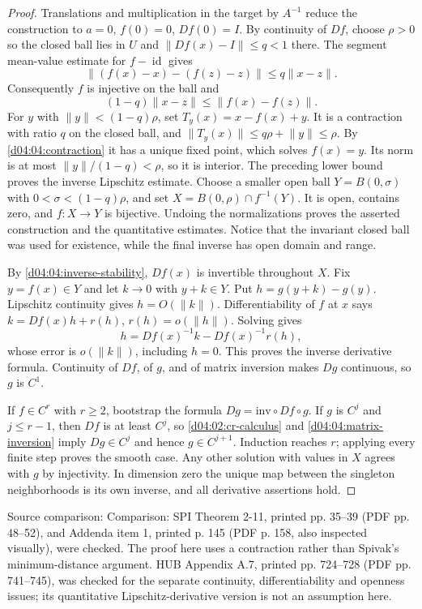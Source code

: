 \documentclass[11pt,oneside,openany]{book}
\theoremstyle{definition}
\theoremstyle{remark}
\newcommand{\norm}[1]{\lVert#1\rVert}
\DeclareMathOperator{\id}{id}
\newcommand{\source}[1]{\par\begingroup\small\sffamily\color{black!65}Source comparison: #1\par\endgroup}
\begin{document}
\begin{proof}
Translations and multiplication in the target by $A^{-1}$ reduce the
construction to $a=0$, $f(0)=0$, $Df(0)=I$. By continuity of $Df$,
choose $\rho>0$ so the closed ball lies in $U$ and
$\norm{Df(x)-I}\leq q<1$ there. The segment mean-value estimate for
$f-\id$ gives
\[
 \norm{(f(x)-x)-(f(z)-z)}\leq q\norm{x-z}.
\]
Consequently $f$ is injective on the ball and
\[
 (1-q)\norm{x-z}\leq\norm{f(x)-f(z)}.
\]
For $y$ with $\norm{y}<(1-q)\rho$, set $T_y(x)=x-f(x)+y$.
It is a contraction with ratio $q$ on the closed ball, and
$\norm{T_y(x)}\leq q\rho+\norm{y}\leq\rho$.
By \cref{d04:04:contraction} it has a unique fixed point, which solves
$f(x)=y$. Its norm is at most $\norm{y}/(1-q)<\rho$, so it is interior.
The preceding lower bound proves the inverse Lipschitz estimate. Choose a
smaller open ball $Y=B(0,\sigma)$ with $0<\sigma<(1-q)\rho$, and set
$X=B(0,\rho)\cap f^{-1}(Y)$. It is open, contains zero, and $f:X\to Y$
is bijective. Undoing the normalizations proves the asserted construction
and the quantitative estimates. Notice that the invariant closed ball was
used for existence, while the final inverse has open domain and range.

By \cref{d04:04:inverse-stability}, $Df(x)$ is invertible throughout $X$.
Fix $y=f(x)\in Y$ and let $k\to0$ with $y+k\in Y$.
Put $h=g(y+k)-g(y)$. Lipschitz continuity gives $h=O(\norm{k})$.
Differentiability of $f$ at $x$ says
$k=Df(x)h+r(h)$, $r(h)=o(\norm{h})$. Solving gives
\[
 h=Df(x)^{-1}k-Df(x)^{-1}r(h),
\]
whose error is $o(\norm{k})$, including $h=0$. This proves the inverse
derivative formula. Continuity of $Df$, of $g$, and of matrix inversion
makes $Dg$ continuous, so $g$ is $C^1$.

If $f\in C^r$ with $r\geq2$, bootstrap the formula
$Dg=\mathrm{inv}\circ Df\circ g$. If $g$ is $C^j$ and $j\leq r-1$,
then $Df$ is at least $C^j$, so \cref{d04:02:cr-calculus} and
\cref{d04:04:matrix-inversion} imply $Dg\in C^j$ and hence
$g\in C^{j+1}$. Induction reaches $r$; applying every finite step proves
the smooth case. Any other solution with values in $X$ agrees with $g$
by injectivity. In dimension zero the unique map between the singleton
neighborhoods is its own inverse, and all derivative assertions hold.
\end{proof}
\source{Comparison: SPI Theorem 2-11, printed pp. 35--39 (PDF pp. 48--52),
and Addenda item 1, printed p. 145 (PDF p. 158, also inspected visually),
were checked. The proof here uses a contraction rather than Spivak's
minimum-distance argument. HUB Appendix A.7, printed pp. 724--728
(PDF pp. 741--745), was checked for the separate continuity,
differentiability and openness issues; its quantitative Lipschitz-derivative
version is not an assumption here.}
\end{document}
